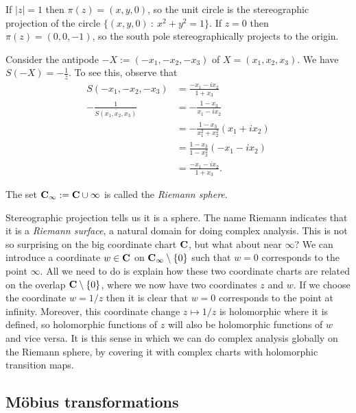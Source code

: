 \documentclass[12pt]{article}
\begin{document}
\begin{exm}
  If $|z|=1$ then $\pi(z)=(x,y,0)$, so the unit circle is the stereographic projection of the circle $\{(x,y,0)\ :\ x^2+y^2=1\}$. If $z=0$ then $\pi(z)=(0,0,-1)$, so the south pole stereographically projects to the origin.
\end{exm}

\begin{exm}
  Consider the antipode $-X:=(-x_1,-x_2,-x_3)$ of $X=(x_1,x_2,x_3)$. We have $S(-X)=-\frac{1}{\bar{z}}$. To see this, observe that
  \begin{align*}
    S(-x_1,-x_2,-x_3)&=\frac{-x_1-ix_2}{1+x_3}\\
    -\frac{1}{\overline{S(x_1,x_2,x_3)}}&=-\frac{1-x_3}{x_1-ix_2}\\
    &=-\frac{1-x_3}{x_1^2+x_2^2}(x_1+ix_2)\\
    &=\frac{1-x_3}{1-x_3^2}(-x_1-ix_2)\\
    &=\frac{-x_1-ix_2}{1+x_3}.
  \end{align*}
\end{exm}

\begin{dfn}
  The set $\mathbf{C}_\infty:=\mathbf{C}\cup\infty$ is called the {\em Riemann sphere}.
\end{dfn}

\begin{rmk}
  Stereographic projection tells us it is a sphere. The name Riemann indicates that it is a {\em Riemann surface}, a natural domain for doing complex analysis. This is not so surprising on the big coordinate chart $\mathbf{C}$, but what about near $\infty$? We can introduce a coordinate $w\in\mathbf{C}$ on $\mathbf{C}_\infty\setminus\{0\}$ such that $w=0$ corresponds to the point $\infty$. All we need to do is explain how these two coordinate charts are related on the overlap $\mathbf{C}\setminus\{0\}$, where we now have two coordinates $z$ and $w$. If we choose the coordinate $w=1/z$ then it is clear that $w=0$ corresponds to the point at infinity. Moreover, this coordinate change $z\mapsto 1/z$ is holomorphic where it is defined, so holomorphic functions of $z$ will also be holomorphic functions of $w$ and vice versa. It is this sense in which we can do complex analysis globally on the Riemann sphere, by covering it with complex charts with holomorphic transition maps.
\end{rmk}

\subsection{M\"obius transformations}
\end{document}
